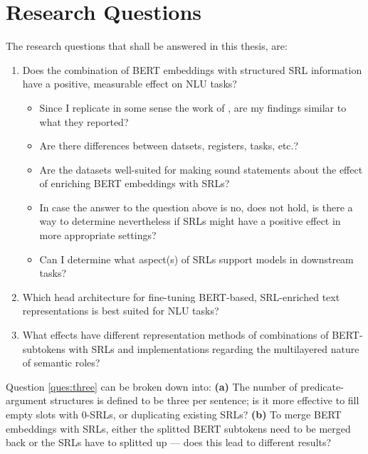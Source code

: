 \section{Research Questions}

The research questions that shall be answered in this thesis, are:

\begin{enumerate}
  \item \label{ques:one} Does the combination of  BERT embeddings with structured SRL information have a positive,
                         measurable effect on NLU tasks?
    \begin{itemize}
      \item Since I replicate in some sense the work of \cite{zhang2019semantics}, are my findings similar to what they reported?
      \item Are there differences between datsets, registers, tasks, etc.?
      \item Are the datasets well-suited for making sound statements about the effect of enriching BERT embeddings with SRLs?
      \item In case the answer to the question above is no, does not hold, is there a way to determine nevertheless if SRLs might have a positive effect in more appropriate settings?
      \item Can I determine what aspect(s) of SRLs support models in downstream tasks?
    \end{itemize}
  \item \label{ques:two} Which head architecture for fine-tuning BERT-based, SRL-enriched text representations is best suited for
                          NLU tasks?
  \item \label{ques:three} What effects have different representation methods of combinations of BERT-subtokens with SRLs and implementations
                          regarding the multilayered nature of semantic roles?
\end{enumerate}

Question \ref{ques:three} can be broken down into: \textbf{(a)} The number of predicate-argument
structures is defined to be three per sentence; is it more effective to fill empty slots with
0-SRLs, or duplicating existing SRLs? \textbf{(b)} To merge BERT embeddings with SRLs, either
the splitted BERT subtokens need to be merged back or the SRLs have to splitted up --- does
this lead to different results?






